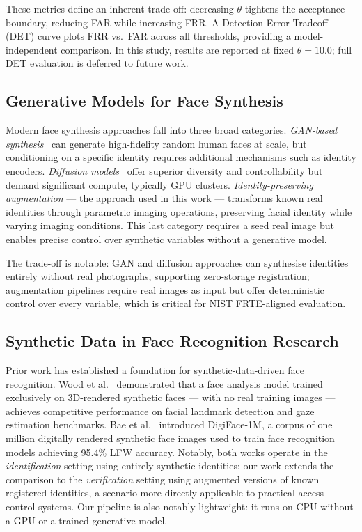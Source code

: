\documentclass[conference]{IEEEtran}
\begin{document}
These metrics define an inherent trade-off: decreasing $\theta$ tightens the acceptance boundary, reducing FAR while increasing FRR. A Detection Error Tradeoff (DET) curve plots FRR vs.\ FAR across all thresholds, providing a model-independent comparison. In this study, results are reported at fixed $\theta = 10.0$; full DET evaluation is deferred to future work.

\subsection{Generative Models for Face Synthesis}

Modern face synthesis approaches fall into three broad categories. \textit{GAN-based synthesis}~\cite{goodfellow2014gan, karras2020stylegan2} can generate high-fidelity random human faces at scale, but conditioning on a specific identity requires additional mechanisms such as identity encoders. \textit{Diffusion models}~\cite{rombach2022diffusion} offer superior diversity and controllability but demand significant compute, typically GPU clusters. \textit{Identity-preserving augmentation} — the approach used in this work — transforms known real identities through parametric imaging operations, preserving facial identity while varying imaging conditions. This last category requires a seed real image but enables precise control over synthetic variables without a generative model.

The trade-off is notable: GAN and diffusion approaches can synthesise identities entirely without real photographs, supporting zero-storage registration; augmentation pipelines require real images as input but offer deterministic control over every variable, which is critical for NIST FRTE-aligned evaluation.

\subsection{Synthetic Data in Face Recognition Research}

Prior work has established a foundation for synthetic-data-driven face recognition. Wood et al.~\cite{wood2021fake} demonstrated that a face analysis model trained exclusively on 3D-rendered synthetic faces — with no real training images — achieves competitive performance on facial landmark detection and gaze estimation benchmarks. Bae et al.~\cite{bae2023digiface} introduced DigiFace-1M, a corpus of one million digitally rendered synthetic face images used to train face recognition models achieving 95.4\% LFW accuracy. Notably, both works operate in the \textit{identification} setting using entirely synthetic identities; our work extends the comparison to the \textit{verification} setting using augmented versions of known registered identities, a scenario more directly applicable to practical access control systems. Our pipeline is also notably lightweight: it runs on CPU without a GPU or a trained generative model.
\end{document}
